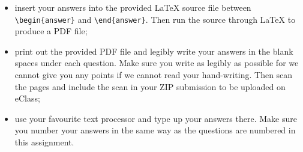 \documentclass{article}
\begin{document}
\begin{itemize}
    \item
    insert your answers into the provided \LaTeX{} source file between \verb|\begin{answer}| and \verb|\end{answer}|. Then run the source through \LaTeX{} to produce a PDF file;

    \item print out the provided PDF file and legibly write your answers in the blank spaces under each question. Make sure you write as legibly as possible for we cannot give you any points if we cannot read your hand-writing. Then scan the pages and include the scan in your ZIP submission to be uploaded on eClass;

    \item use your favourite text processor and type up your answers there. Make sure you number your answers in the same way as the questions are numbered in this assignment.
\end{itemize}
\end{document}
